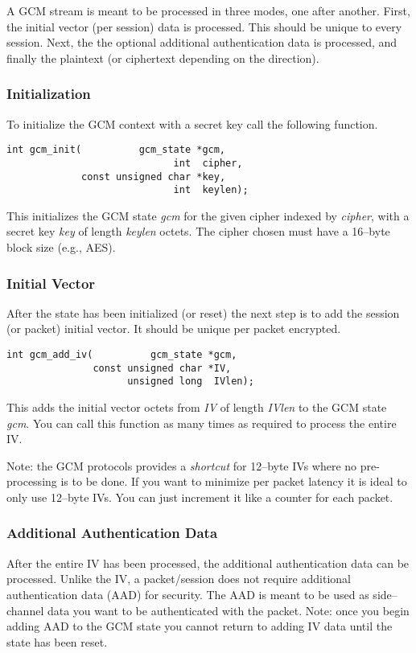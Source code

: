 \documentclass[synpaper]{book}
\begin{document}
A GCM stream is meant to be processed in three modes, one after another.  First, the initial vector (per session) data is processed.  This should be 
unique to every session.  Next, the the optional additional authentication data is processed, and finally the plaintext (or ciphertext depending on the direction).  

\subsubsection{Initialization}
To initialize the GCM context with a secret key call the following function.

\begin{verbatim}
int gcm_init(          gcm_state *gcm, 
                             int  cipher,
             const unsigned char *key, 
                             int  keylen);
\end{verbatim}
This initializes the GCM state \textit{gcm} for the given cipher indexed by \textit{cipher}, with a secret key \textit{key} of length \textit{keylen} octets.  The cipher 
chosen must have a 16--byte block size (e.g., AES).  

\subsubsection{Initial Vector}
After the state has been initialized (or reset) the next step is to add the session (or packet) initial vector.  It should be unique per packet encrypted.

\begin{verbatim}
int gcm_add_iv(          gcm_state *gcm, 
               const unsigned char *IV,     
                     unsigned long  IVlen);
\end{verbatim}
This adds the initial vector octets from \textit{IV} of length \textit{IVlen} to the GCM state \textit{gcm}.  You can call this function as many times as required
to process the entire IV.  

Note: the GCM protocols provides a \textit{shortcut} for 12--byte IVs where no pre-processing is to be done.  If you want to minimize per packet latency it is ideal
to only use 12--byte IVs.  You can just increment it like a counter for each packet.

\subsubsection{Additional Authentication Data}
After the entire IV has been processed, the additional authentication data can be processed.  Unlike the IV, a packet/session does not require additional
authentication data (AAD) for security.  The AAD is meant to be used as side--channel data you want to be authenticated with the packet.  Note:  once
you begin adding AAD to the GCM state you cannot return to adding IV data until the state has been reset.
\end{document}
